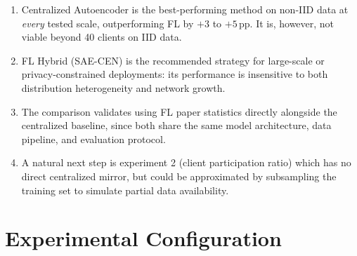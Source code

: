 \documentclass[11pt,a4paper]{article}
\begin{document}
\begin{enumerate}[leftmargin=1.8em]
  \item Centralized Autoencoder is the best-performing method on non-IID data at
        \emph{every} tested scale, outperforming FL by $+3$ to $+5$\,pp.
        It is, however, not viable beyond 40 clients on IID data.

  \item FL Hybrid (SAE-CEN) is the recommended strategy for large-scale or
        privacy-constrained deployments: its performance is insensitive to both
        distribution heterogeneity and network growth.

  \item The comparison validates using FL paper statistics directly alongside
        the centralized baseline, since both share the same model architecture,
        data pipeline, and evaluation protocol.

  \item A natural next step is experiment 2 (client participation ratio) which
        has no direct centralized mirror, but could be approximated by subsampling
        the training set to simulate partial data availability.
\end{enumerate}

\appendix
\section{Experimental Configuration}
\end{document}
